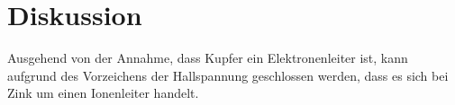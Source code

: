 \section{Diskussion}
Ausgehend von der Annahme, dass Kupfer ein Elektronenleiter ist,
kann aufgrund des Vorzeichens der Hallspannung geschlossen werden, dass es sich bei Zink um einen Ionenleiter handelt.
